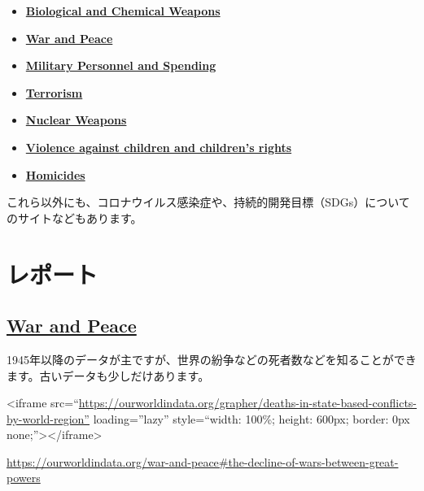 \documentclass[
  xelatex, ja=standard]{bxjsbook}
\theoremstyle{definition}
\theoremstyle{definition}
\theoremstyle{definition}
\theoremstyle{definition}
\theoremstyle{remark}
\begin{document}
\begin{itemize}
  \begin{itemize}
  \item
    \href{https://ourworldindata.org/biological-and-chemical-weapons}{\textbf{Biological and Chemical Weapons}}
  \item
    \href{https://ourworldindata.org/war-and-peace}{\textbf{War and Peace}}
  \item
    \href{https://ourworldindata.org/military-personnel-spending}{\textbf{Military Personnel and Spending}}
  \item
    \href{https://ourworldindata.org/terrorism}{\textbf{Terrorism}}
  \item
    \href{https://ourworldindata.org/nuclear-weapons}{\textbf{Nuclear Weapons}}
  \item
    \href{https://ourworldindata.org/violence-against-rights-for-children}{\textbf{Violence against children and children's rights}}
  \item
    \href{https://ourworldindata.org/homicides}{\textbf{Homicides}}
  \end{itemize}
\end{itemize}

これら以外にも、コロナウイルス感染症や、持続的開発目標（SDGs）についてのサイトなどもあります。

\hypertarget{ux30ecux30ddux30fcux30c8}{%
\section{レポート}\label{ux30ecux30ddux30fcux30c8}}

\hypertarget{war-and-peace}{%
\subsection{\texorpdfstring{\href{https://ourworldindata.org/war-and-peace}{War and Peace}}{War and Peace}}\label{war-and-peace}}

1945年以降のデータが主ですが、世界の紛争などの死者数などを知ることができます。古いデータも少しだけあります。

\textless iframe src=``\href{https://ourworldindata.org/grapher/deaths-in-state-based-conflicts-by-world-region\%22}{https://ourworldindata.org/grapher/deaths-in-state-based-conflicts-by-world-region''} loading=''lazy'' style=``width: 100\%; height: 600px; border: 0px none;''\textgreater\textless/iframe\textgreater{}

\url{https://ourworldindata.org/war-and-peace\#the-decline-of-wars-between-great-powers}
\end{document}
